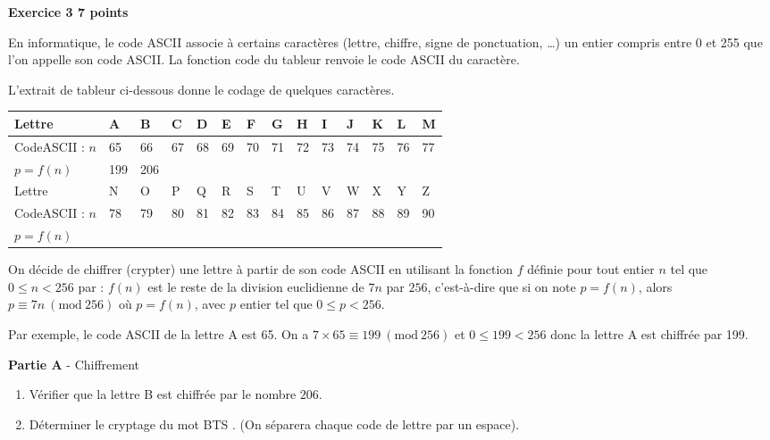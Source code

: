 \documentclass[10pt]{article}
\begin{document}
\vspace{0,5cm}

\textbf{Exercice 3 \hfill 7 points}

\medskip

En informatique, le code ASCII associe à certains caractères (lettre, chiffre, signe de ponctuation, \ldots) un entier compris entre 0 et 255 que l'on appelle son code ASCII. La fonction code du tableur renvoie le code ASCII du caractère. 

L'extrait de tableur ci-dessous donne le codage de quelques caractères.

\begin{center}
\begin{tabularx}{\linewidth}{|l|*{13}{>{\centering \arraybackslash \footnotesize}X|}}\hline
Lettre 			&A	&B	&C	&D	&E	&F	&G	&H	&I	&J	&K	&L	&M\\ \hline
CodeASCII : $n$	&65&66	&67	&68	&69	&70	&71	&72	&73	&74	&75	&76	&77\\ \hline
$p=f(n)$		&199&206&	&	&	&	&	&	&	&	&	&	&\\ \hline\hline
Lettre			&N	&O	&P	&Q	&R	&S	&T	&U	&V	&W	&X	&Y	&Z\\ \hline 
CodeASCII : $n$&78	&79	&80	&81	&82	&83	&84	&85	&86	&87	&88	&89	&90\\ \hline
$p=f(n)$		&	&	&	&	&	&	&	&	&	&	&	&	&\\ \hline
\end{tabularx}
\end{center}

\medskip

On décide de chiffrer (crypter) une lettre à partir de son code ASCII en utilisant la fonction $f$ définie pour tout entier $n$ tel que $0 \leqslant n < 256$ par : $f(n)$ est le reste de la division euclidienne de $7n$ par $256$, c'est-à-dire que si on note $p = f(n)$, alors $p \equiv 7n \:(\text{mod}~256)$ où $p = f(n)$, avec $p$ entier tel que $0 \leqslant p < 256$.

Par exemple, le code ASCII de la lettre A est 65. On a $7 \times 65 \equiv 199\: (\text{mod}~256)$ et $0 \leqslant  199 < 256$ donc la lettre A est chiffrée par 199.

\bigskip

\textbf{Partie A }- Chiffrement

\medskip

\begin{enumerate}
\item Vérifier que la lettre \og B \fg{} est chiffrée par le nombre $206$.
\item Déterminer le cryptage du mot \og BTS \fg. (On séparera chaque code de lettre par un
espace).
\end{enumerate}
\end{document}
